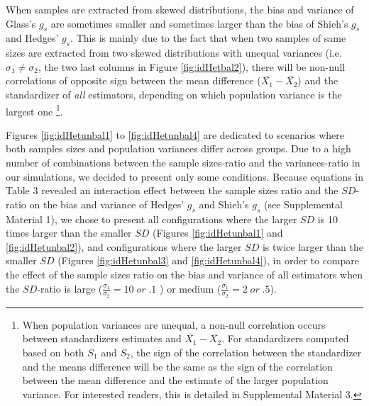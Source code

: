 \documentclass[
  man,floatsintext]{apa6}
\begin{document}
When samples are extracted from skewed distributions, the bias and variance of Glass's \(g_s\) are sometimes smaller and sometimes larger than the bias of Shieh's \(g_s\) and Hedges' \(g_s\). This is mainly due to the fact that when two samples of same sizes are extracted from two skewed distributions with unequal variances (i.e.~\(\sigma_1 \neq\sigma_2\), the two last columns in Figure \ref{fig:idHetbal2}), there will be non-null correlations of opposite sign between the mean difference (\(\bar{X_1}-\bar{X_2}\)) and the standardizer of \emph{all} estimators, depending on which population variance is the largest one \footnote{When population variances are unequal, a non-null correlation occurs between standardizers estimates and $\bar{X_1}-\bar{X_2}$. For standardizers computed based on both $S_1$ and $S_2$, the sign of the correlation between the standardizer and the means difference will be the same as the sign of the correlation between the mean difference and the estimate of the larger population variance. For interested readers, this is detailed in Supplemental Material 3.}.

Figures \ref{fig:idHetunbal1} to \ref{fig:idHetunbal4} are dedicated to scenarios where both samples sizes and population variances differ across groups. Due to a high number of combinations between the sample sizes-ratio and the variances-ratio in our simulations, we decided to present only some conditions. Because equations in Table 3 revealed an interaction effect between the sample sizes ratio and the \(SD\)-ratio on the bias and variance of Hedges' \(g_s\) and Shieh's \(g_s\) (see Supplemental Material 1), we chose to present all configurations where the larger \(SD\) is 10 times larger than the smaller \(SD\) (Figures \ref{fig:idHetunbal1} and \ref{fig:idHetunbal2}), and configurations where the larger \(SD\) is twice larger than the smaller \(SD\) (Figures \ref{fig:idHetunbal3} and \ref{fig:idHetunbal4}), in order to compare the effect of the sample sizes ratio on the bias and variance of all estimators when the \(SD\)-ratio is large (\(\frac{\sigma_1}{\sigma_2}=10 \; or \; .1\) ) or medium (\(\frac{\sigma_1}{\sigma_2}=2 \; or \; .5\)).
\end{document}
